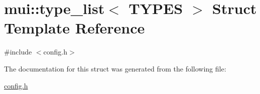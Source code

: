 \hypertarget{structmui_1_1type__list}{}\section{mui\+:\+:type\+\_\+list$<$ T\+Y\+P\+ES $>$ Struct Template Reference}
\label{structmui_1_1type__list}


{\ttfamily \#include $<$config.\+h$>$}



The documentation for this struct was generated from the following file\+:\begin{DoxyCompactItemize}
\item 
\hyperlink{config_8h}{config.\+h}\end{DoxyCompactItemize}
